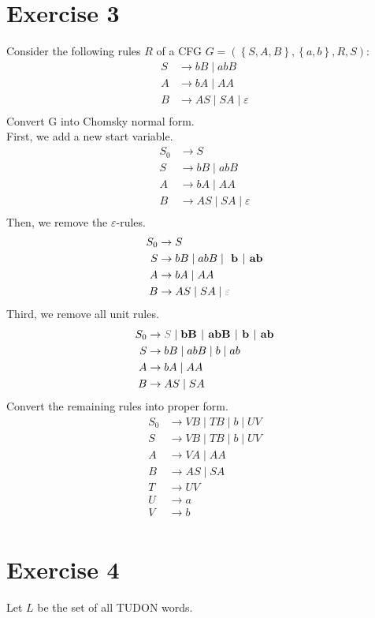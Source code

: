 \documentclass[a4paper,11pt]{article}
\newcommand{\eps}{\varepsilon}
\newcommand{\set}[1]{\left\{ #1 \right\}}
\begin{document}
	\section{Exercise 3}
	Consider the following rules $R$ of a CFG $G = (\set{S,A,B},\set{a,b},R,S)$:
	\begin{align*}
		S &\to bB\mid abB\\
		A &\to bA\mid AA\\
		B &\to AS\mid SA\mid \eps \\
	\end{align*}
	Convert G into Chomsky normal form.\\
	First, we add a new start variable.
	\begin{align*}
		S_0 &\to S\\
		S &\to bB\mid abB\\
		A &\to bA\mid AA\\
		B &\to AS\mid SA\mid \eps \\
	\end{align*}
	Then, we remove the $\eps$-rules.
	\begin{align*}
		S_0 &\to S\\
		S &\to bB\mid abB \mid \textbf{ b $\mid$ ab} \\
		A &\to bA\mid AA\\
		B &\to AS\mid SA\mid \textcolor{gray}{\eps}\\
	\end{align*}
	Third, we remove all unit rules.
	\begin{align*}
		S_0 &\to \textcolor{gray}{S} \mid \textbf{bB $\mid$ abB $\mid$ b $\mid$ ab}\\
		S &\to bB\mid abB \mid b \mid ab \\
		A &\to bA\mid AA\\
		B &\to AS\mid SA\\
	\end{align*}
	Convert the remaining rules into proper form.
	\begin{align*}
		S_0 &\to VB \mid TB \mid b \mid UV\\
		S &\to VB\mid TB \mid b \mid UV \\
		A &\to VA\mid AA\\
		B &\to AS\mid SA\\
		T &\to UV\\
		U &\to a\\
		V &\to b\\
	\end{align*}
	\section{Exercise 4}
	Let $L$ be the set of all TUDON words.
\end{document}
